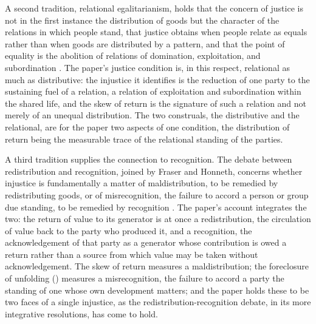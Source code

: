 A second tradition, relational egalitarianism, holds that the concern of justice is not in the first instance the distribution of goods but the character of the relations in which people stand, that justice obtains when people relate as equals rather than when goods are distributed by a pattern, and that the point of equality is the abolition of relations of domination, exploitation, and subordination \parencite{anderson1999}. The paper's justice condition is, in this respect, relational as much as distributive: the injustice it identifies is the reduction of one party to the sustaining fuel of a relation, a relation of exploitation and subordination within the shared life, and the skew of return is the signature of such a relation and not merely of an unequal distribution. The two construals, the distributive and the relational, are for the paper two aspects of one condition, the distribution of return being the measurable trace of the relational standing of the parties.

A third tradition supplies the connection to recognition. The debate between redistribution and recognition, joined by Fraser and Honneth, concerns whether injustice is fundamentally a matter of maldistribution, to be remedied by redistributing goods, or of misrecognition, the failure to accord a person or group due standing, to be remedied by recognition \parencite{fraserhonneth2003}. The paper's account integrates the two: the return of value to its generator is at once a redistribution, the circulation of value back to the party who produced it, and a recognition, the acknowledgement of that party as a generator whose contribution is owed a return rather than a source from which value may be taken without acknowledgement. The skew of return measures a maldistribution; the foreclosure of unfolding () measures a misrecognition, the failure to accord a party the standing of one whose own development matters; and the paper holds these to be two faces of a single injustice, as the redistribution-recognition debate, in its more integrative resolutions, has come to hold.

